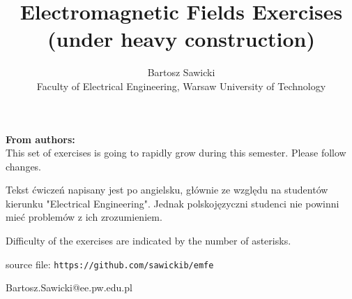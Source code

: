 \documentclass[10pt,a4paper]{article}
\title{Electromagnetic Fields Exercises\\ \vspace{0.5cm} \large{(under heavy construction)}}
\author{Bartosz Sawicki \\ \small{Faculty of Electrical Engineering, Warsaw University of Technology}}
\begin{document}
\maketitle

\noindent\textbf{From authors:}\\
This set of exercises is going to rapidly grow during this semester. Please follow changes. 

Tekst ćwiczeń napisany jest po angielsku, głównie ze względu na studentów kierunku "Electrical Engineering". Jednak polskojęzyczni studenci nie powinni mieć problemów z ich zrozumieniem.

Difficulty of the exercises are indicated by the number of asterisks. 

source file: \verb+https://github.com/sawickib/emfe+

\vspace{0.3cm}
\begin{flushright}
Bartosz.Sawicki@ee.pw.edu.pl
\end{flushright}

\tableofcontents



\end{document}
